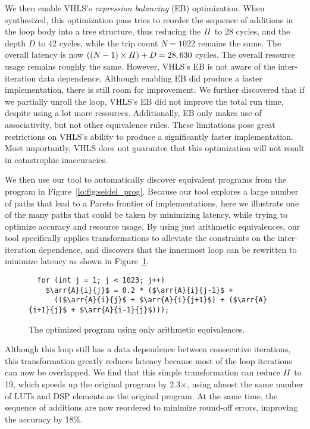 We then enable VHLS's \emph{expression balancing} (EB) optimization.  When
synthesized, this optimization pass tries to reorder the sequence of additions
in the loop body into a tree structure, thus reducing the $\mathit{II}$ to 28 cycles,
and the depth $D$ to 42 cycles, while the trip count $N = 1022$ remains
the same.  The overall latency is now $((N-1) \times \mathit{II}) + D = 28,630$
cycles.  The overall resource usage remains roughly the same.  However,
VHLS's EB is not aware of the inter-iteration data dependence.  Although
enabling EB did produce a faster implementation, there is still room for
improvement.  We further discovered that if we partially unroll the loop,
VHLS's EB did not improve the total run time, despite using a lot more
resources.  Additionally, EB only makes use of associativity, but not other
equivalence rules.  These limitations pose great restrictions on VHLS's ability
to produce a significantly faster implementation.  Most importantly, VHLS
does not guarantee that this optimization will not result in catastrophic
inaccuracies.

We then use our tool to automatically discover equivalent programs from the
program in Figure~\ref{lo:fig:seidel_prog}.  Because our tool explores a
large number of paths that lead to a Pareto frontier of implementations,
here we illustrate one of the many paths that could be taken by minimizing
latency, while trying to optimize accuracy and resource usage.  By using just
arithmetic equivalences, our tool specifically applies transformations to
alleviate the constraints on the inter-iteration dependence, and discovers
that the innermost loop can be rewritten to minimize latency as shown in
Figure~\ref{lo:fig:seidel_prog_2}.

\begin{figure}[ht]
\begin{lstlisting}
  for (int j = 1; j < 1023; j++)
    $\arr{A}{i}{j}$ = 0.2 * ($\arr{A}{i}{j-1}$ +
      (($\arr{A}{i}{j}$ + $\arr{A}{i}{j+1}$) + ($\arr{A}{i+1}{j}$ + $\arr{A}{i-1}{j}$)));
\end{lstlisting}
    \caption{The optimized program using only arithmetic equivalences.}
    \label{lo:fig:seidel_prog_2}
\end{figure}

Although this loop still has a data dependence between consecutive iterations,
this transformation greatly reduces latency because most of the loop iterations
can now be overlapped.  We find that this simple transformation can reduce
$\mathit{II}$ to 19, which speeds up the original program by 2.3$\times$, using almost
the same number of LUTs and DSP elements as the original program.  At the same
time, the sequence of additions are now reordered to minimize round-off errors,
improving the accuracy by 18\%.

